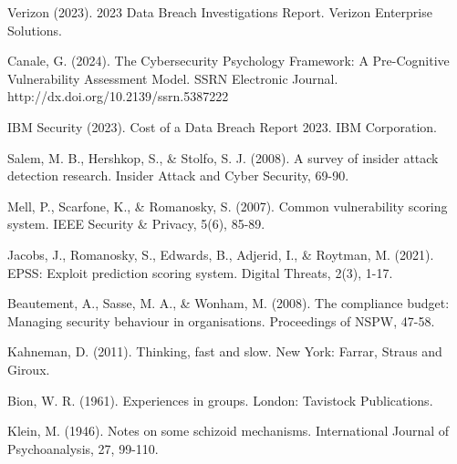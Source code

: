 \documentclass[11pt,a4paper]{article}
\begin{document}
\begin{thebibliography}{99}

Verizon (2023). 2023 Data Breach Investigations Report. Verizon Enterprise Solutions.

Canale, G. (2024). The Cybersecurity Psychology Framework: A Pre-Cognitive Vulnerability Assessment Model. SSRN Electronic Journal. http://dx.doi.org/10.2139/ssrn.5387222

IBM Security (2023). Cost of a Data Breach Report 2023. IBM Corporation.

Salem, M. B., Hershkop, S., \& Stolfo, S. J. (2008). A survey of insider attack detection research. Insider Attack and Cyber Security, 69-90.

Mell, P., Scarfone, K., \& Romanosky, S. (2007). Common vulnerability scoring system. IEEE Security \& Privacy, 5(6), 85-89.

Jacobs, J., Romanosky, S., Edwards, B., Adjerid, I., \& Roytman, M. (2021). EPSS: Exploit prediction scoring system. Digital Threats, 2(3), 1-17.

Beautement, A., Sasse, M. A., \& Wonham, M. (2008). The compliance budget: Managing security behaviour in organisations. Proceedings of NSPW, 47-58.

Kahneman, D. (2011). Thinking, fast and slow. New York: Farrar, Straus and Giroux.

Bion, W. R. (1961). Experiences in groups. London: Tavistock Publications.

Klein, M. (1946). Notes on some schizoid mechanisms. International Journal of Psychoanalysis, 27, 99-110.

\end{thebibliography}
\end{document}

